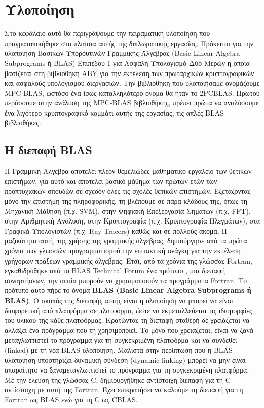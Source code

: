 \chapter{Υλοποίηση}
\label{chapter:implementation}

Στο κεφάλαιο αυτό θα περιγράψουμε την πειραματική υλοποίηση που πραγματοποιήθηκε στα πλαίσια αυτής της διπλωματικής εργασίας. Πρόκειται για την υλοποίηση Βασικών Υπορουτινών Γραμμικής Άλγεβρας (Basic Linear Algebra Subprograms ή BLAS) Επιπέδου 1 για Ασφαλή Υπολογισμό Δύο Μερών η οποία βασίζεται στη βιβλιοθήκη ABY για την εκτέλεση των πρωταρχικών κρυπτογραφικών και ασφαλούς υπολογισμού διεργασιών. Την βιβλιοθήκη που υλοποιήσαμε ονομάζουμε MPC-BLAS, ωστόσο ένα ίσως καταλληλότερο όνομα θα ήταν το 2PCBLAS. Πρωτού περάσουμε στην ανάλυση της MPC-BLAS βιβλιοθήκης, πρέπει πρώτα να αναλύσουμε ένα λιγότερο κρυπτογραφικό κομμάτι αυτής της εργασίας, τις απλές BLAS βιβλιοθήκες.


\section{Η διεπαφή BLAS}

Η Γραμμική Άλγεβρα αποτελεί πλέον θεμελιώδες μαθηματικό εργαλείο των θετικών επιστήμων, για αυτό και αποτελεί βασικό μάθημα των πρώτων ετών των προπτυχιακών σπουδών σε σχεδόν όλες τις σχολές θετικών επιστημών. Εξετάζοντας μόνο την επιστήμη της πληροφορικής, τη βλέπουμε σε πάρα κλάδους της, όπως τη Μηχανική Μάθηση (π.χ. SVM), στην Ψηφιακή Επεξεργασία Σημάτων (π.χ. FFT), στην Αριθμητική Ανάλυση, στην Κρυπτογραφία (π.χ. Κρυπτογραφία Πλεγμάτων), στα Γραφικά Υπολογιστών (π.χ. Ray Tracers) καθώς και σε πολλούς ακόμα.
Η μαζικότητα αυτή, της χρήσης της γραμμικής άλγεβρας, δημιούργησε από τα πρώτα χρόνια των γλωσσών προγραμματισμού την επιτακτική ανάγκη για την εκτέλεση γρήγορων πράξεων γραμμικής άλγεβρας. Έτσι, από τα χρόνια της γλώσσας Fortran, εγκαθιδρύθηκε από το BLAS Technical Forum ένα πρότυπο \cite{blackford2002updated}, μια διεπαφή συναρτήσεων, την οποία μπορούν να χρησιμοποιούν τα προγράμματα Fortran. Το πρότυπο αυτό πήρε το όνομα \textbf{BLAS (Basic Linear Algebra Subprograms ή BLAS)}. Ο σκοπός της διεπαφής αυτής είναι η υλοποίηση να μπορεί να είναι διαφορετική
από πλατφόρμα σε πλατφόρμα, ώστε να εκμεταλλεύεται τις ιδιομορφίες του υλικού της κάθε πλατφόρμας. Κρατώντας τη διεπαφή σταθερή δε χρειάζεται να αλλάξει ένα πρόγραμμα που τη χρησιμοποιεί. Το μόνο που χρειάζεται, είναι να ξανά μεταγλωττιστεί το πρόγραμμα για τη συγκεκριμένη πλατφόρμα και να συνδεθεί (linked) με τη νέα BLAS υλοποίηση. Μάλιστα στην περίπτωση που η BLAS υλοποίηση υποστηρίζει δυναμική σύνδεση (dynamic linking) μπορεί να μην είναι απαραίτητο να ξαναμεταγλωττιστεί το πρόγραμμα για τη συγκεκριμένη πλατφόρμα. Με την έλευση της γλώσσας C, δημιουργήθηκε αντίστοιχη διεπαφή για τη C αντίστοιχη με αυτή της Fortran. Έχει επικρατήσει να καλούμε τη διεπαφή για τη Fortran ως BLAS ενώ για τη C ως CBLAS.


